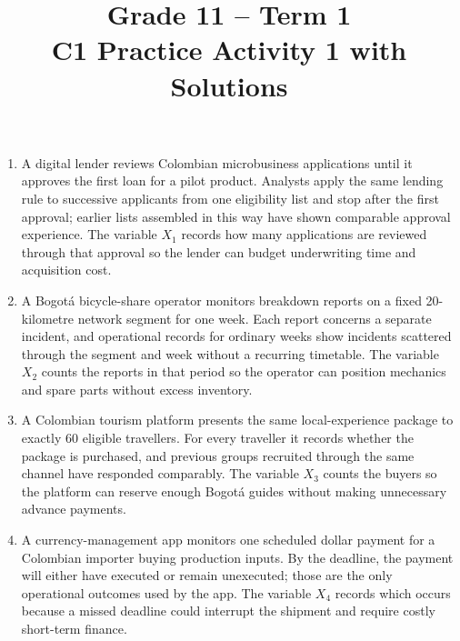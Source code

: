 \makeatletter
{}
\makeatother






\title{Grade 11 -- Term 1 \\ C1 Practice Activity 1 with Solutions}
\author{}
\date{}



	


	\begin{enumerate}
		\item A digital lender reviews Colombian microbusiness applications until it approves the first loan for a pilot product. Analysts apply the same lending rule to successive applicants from one eligibility list and stop after the first approval; earlier lists assembled in this way have shown comparable approval experience. The variable \(X_1\) records how many applications are reviewed through that approval so the lender can budget underwriting time and acquisition cost.
		\item A Bogotá bicycle-share operator monitors breakdown reports on a fixed 20-kilometre network segment for one week. Each report concerns a separate incident, and operational records for ordinary weeks show incidents scattered through the segment and week without a recurring timetable. The variable \(X_2\) counts the reports in that period so the operator can position mechanics and spare parts without excess inventory.
		\item A Colombian tourism platform presents the same local-experience package to exactly 60 eligible travellers. For every traveller it records whether the package is purchased, and previous groups recruited through the same channel have responded comparably. The variable \(X_3\) counts the buyers so the platform can reserve enough Bogotá guides without making unnecessary advance payments.
		\item A currency-management app monitors one scheduled dollar payment for a Colombian importer buying production inputs. By the deadline, the payment will either have executed or remain unexecuted; those are the only operational outcomes used by the app. The variable \(X_4\) records which occurs because a missed deadline could interrupt the shipment and require costly short-term finance.
	\end{enumerate}


